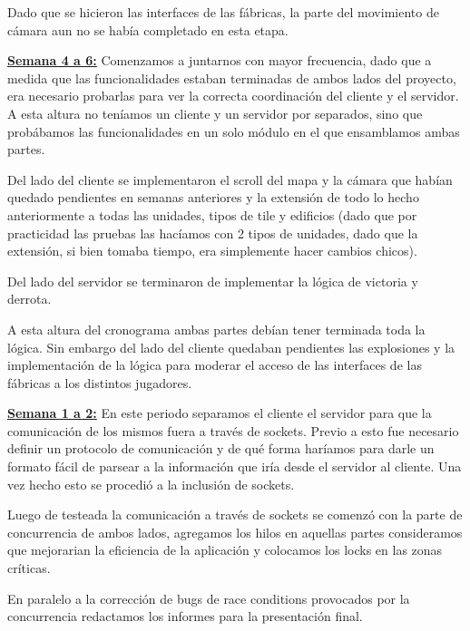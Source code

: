 Dado que se hicieron las interfaces de las fábricas, la parte del movimiento de
cámara aun no se había completado en esta etapa.

\hfill \break
\underline{\textbf{Semana 4 a 6:}}
Comenzamos a juntarnos con mayor frecuencia, dado que a medida que las
funcionalidades estaban terminadas de ambos lados del proyecto, era necesario
probarlas para ver la correcta coordinación del cliente y el servidor. A esta
altura no teníamos un cliente y un servidor por separados, sino que probábamos
las funcionalidades en un solo módulo en el que ensamblamos ambas partes.

Del lado del cliente se implementaron el scroll del mapa y la cámara que habían
quedado pendientes en semanas anteriores y la extensión de todo lo hecho
anteriormente a todas las unidades, tipos de tile y edificios (dado que por
practicidad las pruebas las hacíamos con 2 tipos de unidades, dado que la
extensión, si bien tomaba tiempo, era simplemente hacer cambios chicos).

Del lado del servidor se terminaron de implementar la lógica de victoria y
derrota.

A esta altura del cronograma ambas partes debían tener terminada toda la lógica.
Sin embargo del lado del cliente quedaban pendientes las explosiones y la
implementación de la lógica para moderar el acceso de las interfaces de las
fábricas a los distintos jugadores.

\hfill \break
\underline{\textbf{Semana 1 a 2:}}
En este periodo separamos el cliente el servidor para que la comunicación de los
mismos fuera a través de sockets. Previo a esto fue necesario definir un
protocolo de comunicación y de qué forma haríamos para darle un formato fácil de
parsear a la información que iría desde el servidor al cliente. Una vez hecho
esto se procedió a la inclusión de sockets.

Luego de testeada la comunicación a través de sockets se comenzó con la parte de
concurrencia de ambos lados, agregamos los hilos en aquellas partes consideramos
que mejorarian la eficiencia de la aplicación y colocamos los locks en las zonas
críticas.

En paralelo a la corrección de bugs de race conditions provocados por la
concurrencia redactamos los informes para la presentación final.